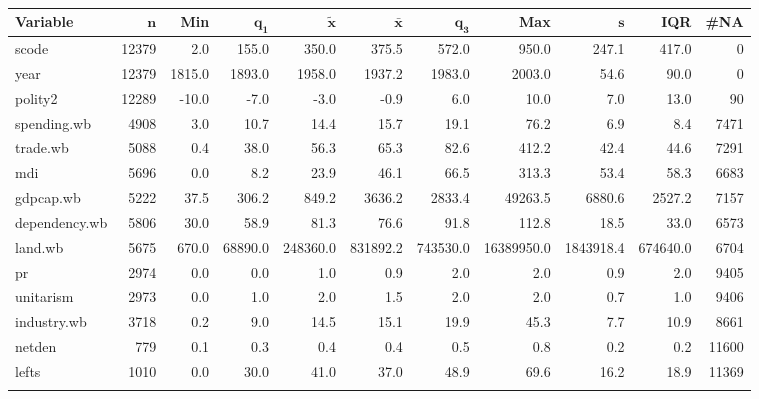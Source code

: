 \begin{landscape}
\begin{longtable}{lrrrrrrrrrr}
 \textbf{Variable} & $\mathbf{n}$ & \textbf{Min} & $\mathbf{q_1}$ & $\mathbf{\widetilde{x}}$ & $\mathbf{\bar{x}}$ & $\mathbf{q_3}$ & \textbf{Max} & $\mathbf{s}$ & \textbf{IQR} & \textbf{\#NA} \\ 
  \hline
scode & 12379 &    2.0 &   155.0 &    350.0 &    375.5 &    572.0 &      950.0 &     247.1 &    417.0 &     0 \\ 
  year & 12379 & 1815.0 &  1893.0 &   1958.0 &   1937.2 &   1983.0 &     2003.0 &      54.6 &     90.0 &     0 \\ 
  polity2 & 12289 &  -10.0 &    -7.0 &     -3.0 &     -0.9 &      6.0 &       10.0 &       7.0 &     13.0 &    90 \\ 
  spending.wb &  4908 &    3.0 &    10.7 &     14.4 &     15.7 &     19.1 &       76.2 &       6.9 &      8.4 &  7471 \\ 
  trade.wb &  5088 &    0.4 &    38.0 &     56.3 &     65.3 &     82.6 &      412.2 &      42.4 &     44.6 &  7291 \\ 
  mdi &  5696 &    0.0 &     8.2 &     23.9 &     46.1 &     66.5 &      313.3 &      53.4 &     58.3 &  6683 \\ 
  gdpcap.wb &  5222 &   37.5 &   306.2 &    849.2 &   3636.2 &   2833.4 &    49263.5 &    6880.6 &   2527.2 &  7157 \\ 
  dependency.wb &  5806 &   30.0 &    58.9 &     81.3 &     76.6 &     91.8 &      112.8 &      18.5 &     33.0 &  6573 \\ 
  land.wb &  5675 &  670.0 & 68890.0 & 248360.0 & 831892.2 & 743530.0 & 16389950.0 & 1843918.4 & 674640.0 &  6704 \\ 
  pr &  2974 &    0.0 &     0.0 &      1.0 &      0.9 &      2.0 &        2.0 &       0.9 &      2.0 &  9405 \\ 
  unitarism &  2973 &    0.0 &     1.0 &      2.0 &      1.5 &      2.0 &        2.0 &       0.7 &      1.0 &  9406 \\ 
  industry.wb &  3718 &    0.2 &     9.0 &     14.5 &     15.1 &     19.9 &       45.3 &       7.7 &     10.9 &  8661 \\ 
  netden &   779 &    0.1 &     0.3 &      0.4 &      0.4 &      0.5 &        0.8 &       0.2 &      0.2 & 11600 \\ 
  lefts &  1010 &    0.0 &    30.0 &     41.0 &     37.0 &     48.9 &       69.6 &      16.2 &     18.9 & 11369 \\ 
  \hline
\caption{}
\label{}
\end{longtable}
\end{landscape}
